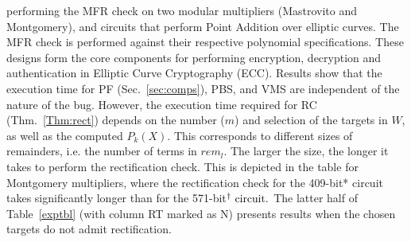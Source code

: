 performing the MFR check on two modular multipliers (Mastrovito and Montgomery), and circuits
that perform Point Addition over elliptic curves. The MFR check is performed against 
their respective polynomial specifications. 
These designs form the core components for performing encryption, 
decryption and authentication in Elliptic Curve Cryptography (ECC).
Results show that the execution time for PF (Sec.~\ref{sec:comps}), PBS, and 
VMS are independent of the nature of the bug.
However, the execution time required for RC (Thm.~\ref{Thm:rect}) depends 
on the number ($m$) and selection of the targets in $W$, as well as the
computed $P_k(X)$. This corresponds 
to different sizes of remainders, i.e. the number of terms in $rem_l$. The larger the size, 
the longer it takes to perform the rectification check. This is depicted in the table for 
Montgomery multipliers, where the rectification check for the 409-bit* circuit takes 
significantly longer than for the 571-bit$\td~\text{circuit}.$ 
The latter half of Table~\ref{exptbl} (with column RT marked as N) presents 
results when the chosen targets do not admit rectification.


